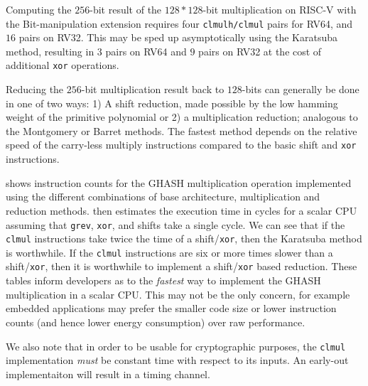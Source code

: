 Computing the $256$-bit result of the $128*128$-bit multiplication
on RISC-V with the Bit-manipulation extension requires
four {\tt clmulh/clmul} pairs for RV64,
and $16$ pairs on RV32.
This may be sped up asymptotically using the Karatsuba method,
resulting in $3$ pairs on RV64 and $9$ pairs on RV32
at the cost of additional {\tt xor} operations.

Reducing the $256$-bit multiplication result back to $128$-bits
can generally be done in one of two ways:
1) A shift reduction, made possible by the low hamming weight of
the primitive polynomial
or
2) a multiplication reduction; analogous to the Montgomery or
Barret methods.
The fastest method depends on the relative speed of
the carry-less multiply instructions compared to the basic
shift and {\tt xor} instructions.

 shows instruction counts for the GHASH multiplication
operation implemented using the different combinations of base architecture,
multiplication and reduction methods.
 then estimates the execution time in cycles
for a scalar CPU assuming that {\tt grev}, {\tt xor}, and shifts take a
single cycle.
We can see that if the {\tt clmul} instructions take twice the time
of a shift/{\tt xor}, then the Karatsuba method is worthwhile.
If the {\tt clmul} instructions are six or more times slower than
a shift/{\tt xor}, then it is worthwhile to implement a shift/{\tt xor}
based reduction.
These tables inform developers as to the {\em fastest} way to implement
the GHASH multiplication in a scalar CPU.
This may not be the only concern, for example embedded applications may
prefer the smaller code size or lower instruction counts (and hence
lower energy consumption) over raw performance.

We also note that in order to be usable for cryptographic purposes, the
{\tt clmul} implementation {\em must} be constant time with respect
to its inputs.
An early-out implementaiton will result in a timing channel.

